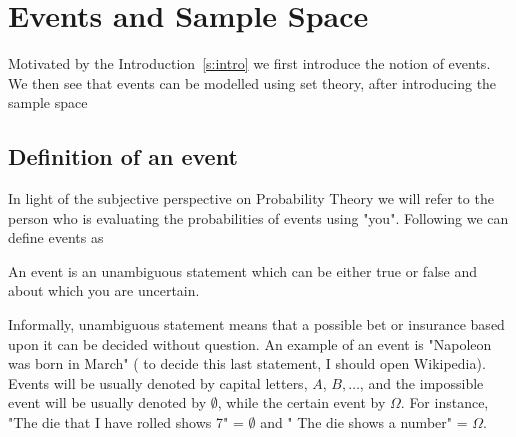 

\section{Events and Sample Space}
Motivated by the Introduction~\ref{s:intro} we first introduce the notion of events. We then see that events can be modelled using set theory, after introducing the sample space

\subsection{Definition of an event}
In light of the subjective perspective on Probability Theory we will refer to the person who is evaluating the probabilities of events using "you". Following \cite{definetti}  we can define events as 
\begin{definition}
    \label{d:event}
    An event is an unambiguous statement which can be either true or false and about which you are uncertain.
\end{definition}
Informally, unambiguous statement means that a possible bet or insurance based upon it can be decided without question. 
An example of an event is "Napoleon was born in March" ( to decide this last statement, I should open Wikipedia). 
Events will be usually denoted by capital letters, $A$, $B, \ldots$, and the impossible event will be usually denoted by $\emptyset$, while the certain event by $\Omega$. For instance, "The die that I have rolled shows 7" = $\emptyset$ and " The die shows a number" = $\Omega$.  



